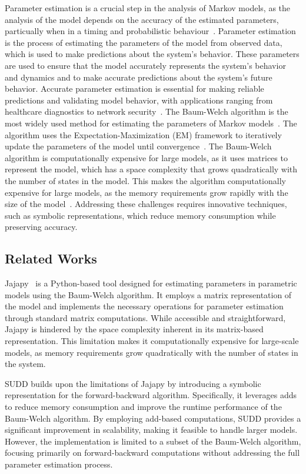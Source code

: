 Parameter estimation is a crucial step in the analysis of Markov models, as the analysis of the model depends on the accuracy of the estimated parameters, particually when in a timing and probabilistic behaviour~\cite{bacci2023mm}.
Parameter estimation is the process of estimating the parameters of the model from observed data, which is used to make predictions about the system's behavior.
These parameters are used to ensure that the model accurately represents the system's behavior and dynamics and to make accurate predictions about the system's future behavior.
Accurate parameter estimation is essential for making reliable predictions and validating model behavior, with applications ranging from healthcare diagnostics to network security~\cite{bacci2023mm}.
The Baum-Welch algorithm is the most widely used method for estimating the parameters of Markov models~\cite{kenny2014deep}.
The algorithm uses the Expectation-Maximization (EM) framework to iteratively update the parameters of the model until convergence~\cite{levinson1983introduction}.
The Baum-Welch algorithm is computationally expensive for large models, as it uses matrices to represent the model, which has a space complexity that grows quadratically with the number of states in the model. 
This makes the algorithm computationally expensive for large models, as the memory requirements grow rapidly with the size of the model~\cite{davis2004comparing}.
Addressing these challenges requires innovative techniques, such as symbolic representations, which reduce memory consumption while preserving accuracy.

\subsection{Related Works}
Jajapy~\cite{reynouard2023jajapy} is a Python-based tool designed for estimating parameters in parametric models using the Baum-Welch algorithm. It employs a matrix representation of the model and implements the necessary operations for parameter estimation through standard matrix computations. While accessible and straightforward, Jajapy is hindered by the space complexity inherent in its matrix-based representation. This limitation makes it computationally expensive for large-scale models, as memory requirements grow quadratically with the number of states in the system.

SUDD builds upon the limitations of Jajapy by introducing a symbolic representation for the forward-backward algorithm. Specifically, it leverages \glspl{add} to reduce memory consumption and improve the runtime performance of the Baum-Welch algorithm. By employing \gls{add}-based computations, SUDD provides a significant improvement in scalability, making it feasible to handle larger models. However, the implementation is limited to a subset of the Baum-Welch algorithm, focusing primarily on forward-backward computations without addressing the full parameter estimation process.

